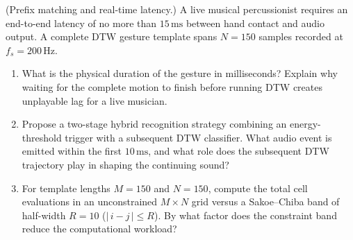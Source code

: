 \begin{exercise}
(Prefix matching and real-time latency.) A live musical percussionist requires an end-to-end latency of no more than $15\,\text{ms}$ between hand contact and audio output. A complete DTW gesture template spans $N = 150$ samples recorded at $f_s = 200\,\text{Hz}$.
\begin{enumerate}[label=(\alph*)]
  \item What is the physical duration of the gesture in milliseconds? Explain why waiting for the complete motion to finish before running DTW creates unplayable lag for a live musician.
  \item Propose a two-stage hybrid recognition strategy combining an energy-threshold trigger with a subsequent DTW classifier. What audio event is emitted within the first $10\,\text{ms}$, and what role does the subsequent DTW trajectory play in shaping the continuing sound?
  \item For template lengths $M = 150$ and $N = 150$, compute the total cell evaluations in an unconstrained $M \times N$ grid versus a Sakoe--Chiba band of half-width $R = 10$ ($|\,i - j\,| \le R$). By what factor does the constraint band reduce the computational workload?
\end{enumerate}
\end{exercise}
